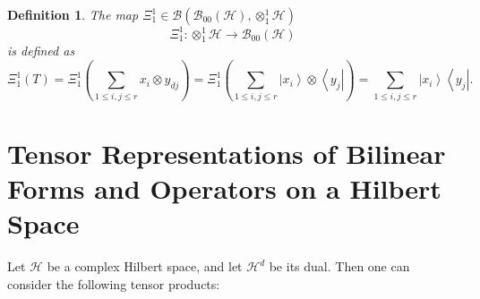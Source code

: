 \documentclass[aps,preprint]{revtex4}
\newtheorem{definition}[theorem]{Definition}
\begin{document}
\begin{definition}
The map $\Xi _{1}^{1}\in \mathcal{B}\left( \mathcal{B}_{00}\left( \mathcal{H}%
\right) ,\otimes _{1}^{1}\mathcal{H}\right) $ 
\begin{equation}
\Xi _{1}^{1}:\otimes _{1}^{1}\mathcal{H\rightarrow B}_{00}\left( \mathcal{H}%
\right)
\end{equation}%
is defined as%
\begin{equation}
\Xi _{1}^{1}\left( T\right) =\Xi _{1}^{1}\left( \sum_{1\leq i,j\leq
r}x_{i}\otimes y_{dj}\right) =\Xi _{1}^{1}\left( \sum_{1\leq i,j\leq
r}\left\vert x_{i}\right\rangle \otimes \left\langle y_{j}\right\vert
\right) =\sum_{1\leq i,j\leq r}\left\vert x_{i}\right\rangle \left\langle
y_{j}\right\vert .
\end{equation}
\end{definition}

\section{Tensor Representations of Bilinear Forms and Operators on a Hilbert
Space}

Let $\mathcal{H}$ be a complex Hilbert space, and let $\mathcal{H}^{d}$ be
its dual. Then one can consider the following tensor products:
\end{document}
